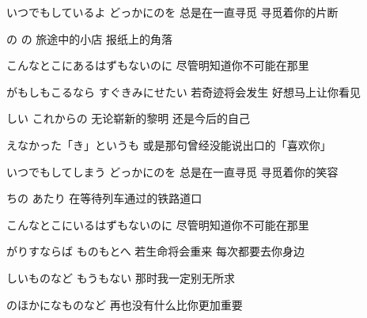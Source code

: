 \documentclass[12pt]{article}
\begin{document}
{\item
いつでもしているよ どっかにのを
\hfill {\small
总是在一直寻觅 寻觅着你的片断 }

の の
\hfill {\small
旅途中的小店 报纸上的角落 }

こんなとこにあるはずもないのに
\hfill {\small
尽管明知道你不可能在那里 }

がもしもこるなら すぐきみにせたい
\hfill {\small
若奇迹将会发生 好想马上让你看见 }

しい これからの
\hfill {\small
无论崭新的黎明 还是今后的自己 }

えなかった「き」というも
\hfill {\small
或是那句曾经没能说出口的「喜欢你」 }

\item
いつでもしてしまう どっかにのを
\hfill {\small
总是在一直寻觅 寻觅着你的笑容 }

ちの あたり
\hfill {\small
在等待列车通过的铁路道口 }

こんなとこにいるはずもないのに
\hfill {\small
尽管明知道你不可能在那里 }

がりすならば ものもとへ
\hfill {\small
若生命将会重来 每次都要去你身边 }

しいものなど もうもない
\hfill {\small
那时我一定别无所求 }

のほかになものなど
\hfill {\small
再也没有什么比你更加重要 }

}
\end{document}
